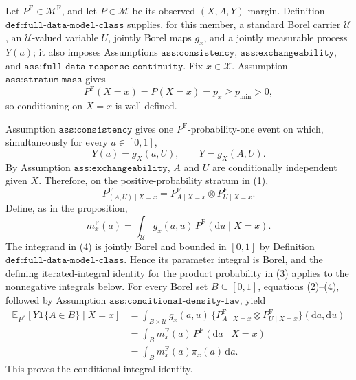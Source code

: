 Let \(P^{\mathrm F}\in\mathcal M^{\mathrm F}\), and let \(P\in\mathcal M\) be its observed \((X,A,Y)\)-margin.  Definition \(\texttt{def:full-data-model-class}\) supplies, for this member, a standard Borel carrier \(\mathcal U\), an \(\mathcal U\)-valued variable \(U\), jointly Borel maps \(g_x\), and a jointly measurable process \(Y(a)\); it also imposes Assumptions \(\texttt{ass:consistency}\), \(\texttt{ass:exchangeability}\), and \(\texttt{ass:full-data-response-continuity}\).  Fix \(x\in\mathcal X\).  Assumption \(\texttt{ass:stratum-mass}\) gives
\[
 P^{\mathrm F}(X=x)=P(X=x)=p_x\geq p_{\min}>0,
 \tag{1}
\]
so conditioning on \(X=x\) is well defined.

Assumption \(\texttt{ass:consistency}\) gives one \(P^{\mathrm F}\)-probability-one event on which, simultaneously for every \(a\in[0,1]\),
\[
 Y(a)=g_X(a,U),
 \qquad
 Y=g_X(A,U).
 \tag{2}
\]
By Assumption \(\texttt{ass:exchangeability}\), \(A\) and \(U\) are conditionally independent given \(X\).  Therefore, on the positive-probability stratum in (1),
\[
 P^{\mathrm F}_{(A,U)\mid X=x}
 =P^{\mathrm F}_{A\mid X=x}\otimes P^{\mathrm F}_{U\mid X=x}.
 \tag{3}
\]
Define, as in the proposition,
\[
 m_x^{\mathrm F}(a)
 =\int_{\mathcal U}g_x(a,u)\,P^{\mathrm F}(\mathrm du\mid X=x).
 \tag{4}
\]
The integrand in (4) is jointly Borel and bounded in \([0,1]\) by Definition \(\texttt{def:full-data-model-class}\).  Hence its parameter integral is Borel, and the defining iterated-integral identity for the product probability in (3) applies to the nonnegative integrals below.  For every Borel set \(B\subseteq[0,1]\), equations (2)--(4), followed by Assumption \(\texttt{ass:conditional-density-law}\), yield
\[
\begin{aligned}
 \mathbb E_{P^{\mathrm F}}[Y\mathbf 1\{A\in B\}\mid X=x]
 &=\int_{B\times\mathcal U}g_x(a,u)\,
   \{P^{\mathrm F}_{A\mid X=x}\otimes P^{\mathrm F}_{U\mid X=x}\}
   (\mathrm da,\mathrm du)\\
 &=\int_Bm_x^{\mathrm F}(a)\,P^{\mathrm F}(\mathrm da\mid X=x)\\
 &=\int_Bm_x^{\mathrm F}(a)\pi_x(a)\,\mathrm da.
\end{aligned}
\tag{5}
\]
This proves the conditional integral identity.

